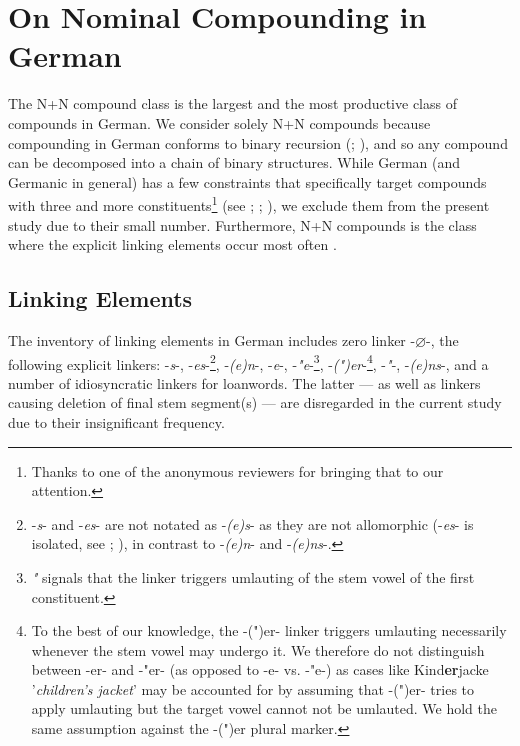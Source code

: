 \documentclass[10pt, a4paper]{article}
\newcommand{\zeroLinker}{\ensuremath{\boldsymbol{\varnothing}}}
\begin{document}



\section{On Nominal Compounding in German}
\label{sec:comps}

The N+N compound class is the largest and the most productive class of compounds in German. We consider solely N+N compounds because compounding in German conforms to binary recursion (\citealp[219]{eisenberg_2013}; \citealp[226-227]{schaefer_2018}), and so any compound can be decomposed into a chain of binary structures. While German (and Germanic in general) has a few constraints that specifically target compounds with three and more constituents\footnote{Thanks to one of the anonymous reviewers for bringing that to our attention.} (see \citealp{krott_etal_2004}; \citealp{kuerschner_2005}; \citealp{wegener_2005}), we exclude them from the present study due to their small number. Furthermore, N+N compounds is the class where the explicit linking elements occur most often \citep{schluecker_2023}.


\subsection{Linking Elements}
\label{sec:linkers}

The inventory of linking elements in German includes zero linker \mbox{-{\zeroLinker}-}, the following explicit linkers: \mbox{-\textit{s}-}, \mbox{-\textit{es}-}\footnote{\mbox{-\textit{s}-} and \mbox{-\textit{es}-} are not notated as -\textit{(e)s}- as they are not allomorphic (\mbox{-\textit{es}-} is isolated, see \citealp[229]{eisenberg_2013}; \citealp{kuerschner_2010}), in contrast to \mbox{-\textit{(e)n}-} and \mbox{-\textit{(e)ns}-}.}, \mbox{-\textit{(e)n}-}, \mbox{-\textit{e}-}, \mbox{-\textit{"e}-}\footnote{\textit{"} signals that the linker triggers umlauting of the stem vowel of the first constituent.}, \mbox{\mbox{-\textit{(")er}}-}\footnote{To the best of our knowledge, the -(")er- linker triggers umlauting necessarily whenever the stem vowel may undergo it. We therefore do not distinguish between -er- and -"er- (as opposed to -e- vs. -"e-) as cases like Kind\textbf{er}jacke '\textit{children's jacket}' may be accounted for by assuming that -(")er- tries to apply umlauting but the target vowel cannot not be umlauted. We hold the same assumption against the -(")er plural marker.}, \mbox{-\textit{"}-}, \mbox{-\textit{(e)ns}-}, and a number of idiosyncratic linkers for loanwords. The latter --- as well as linkers causing deletion of final stem segment(s) --- are disregarded in the current study due to their insignificant frequency.
\end{document}
